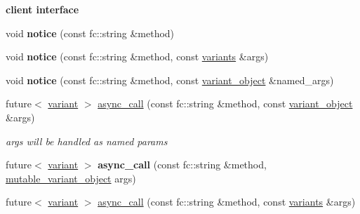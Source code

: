 \begin{Indent}\textbf{ client interface}\par
\begin{DoxyCompactItemize}
\item 
\mbox{\label{classfc_1_1rpc_1_1json__connection_a4b9d4dd844f2d2165be153fff8e3385c}} 
void {\bfseries notice} (const fc\+::string \&method)
\item 
\mbox{\label{classfc_1_1rpc_1_1json__connection_acca97c3c88d4d34be7b5a0b01759f2d4}} 
void {\bfseries notice} (const fc\+::string \&method, const \mbox{\hyperlink{classstd_1_1vector}{variants}} \&args)
\item 
\mbox{\label{classfc_1_1rpc_1_1json__connection_a9d41b8a0cff4073175039247a3bf3735}} 
void {\bfseries notice} (const fc\+::string \&method, const \mbox{\hyperlink{classfc_1_1variant__object}{variant\+\_\+object}} \&named\+\_\+args)
\item 
\mbox{\label{classfc_1_1rpc_1_1json__connection_aea48c6cc30f3dcb15deb2f97ad74cf6c}} 
future$<$ \mbox{\hyperlink{classfc_1_1variant}{variant}} $>$ \mbox{\hyperlink{classfc_1_1rpc_1_1json__connection_aea48c6cc30f3dcb15deb2f97ad74cf6c}{async\+\_\+call}} (const fc\+::string \&method, const \mbox{\hyperlink{classfc_1_1variant__object}{variant\+\_\+object}} \&args)
\begin{DoxyCompactList}\small\item\em args will be handled as named params \end{DoxyCompactList}\item 
\mbox{\label{classfc_1_1rpc_1_1json__connection_a4160e9376eb33957f975ff4b71b8da41}} 
future$<$ \mbox{\hyperlink{classfc_1_1variant}{variant}} $>$ {\bfseries async\+\_\+call} (const fc\+::string \&method, \mbox{\hyperlink{classfc_1_1mutable__variant__object}{mutable\+\_\+variant\+\_\+object}} args)
\item 
\mbox{\label{classfc_1_1rpc_1_1json__connection_a4301c526d028182aa39d8ecff8bd42e5}} 
future$<$ \mbox{\hyperlink{classfc_1_1variant}{variant}} $>$ \mbox{\hyperlink{classfc_1_1rpc_1_1json__connection_a4301c526d028182aa39d8ecff8bd42e5}{async\+\_\+call}} (const fc\+::string \&method, const \mbox{\hyperlink{classstd_1_1vector}{variants}} \&args)

\end{DoxyCompactItemize}
\end{Indent}
